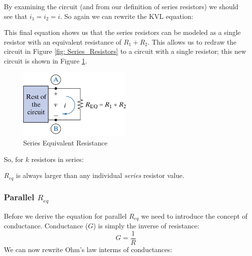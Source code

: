\documentclass{handout}
\begin{document}

By examining the circuit (and from our definition of series resistors) we should see that $i_1=i_2=i$.  So again we can rewrite the KVL equation:


This final equation shows us that the series resistors can be modeled as a single resistor with an equivalent resistance of $R_1+R_2$.  This allows us to redraw the circuit in Figure \ref{fig: Series_Resistors} to a circuit with a single resistor; this new circuit is shown in Figure \ref{fig: SeriesReq}.

\begin{figure}[h t b]
\centering
\includegraphics[width=0.5\textwidth]{SeriesReq.jpg}
\caption{Series Equivalent Resistance}
\label{fig: SeriesReq}
\end{figure}

So, for $k$ resistors in series:


$R_{eq}$ is always larger than any individual {\em series} resistor value.

\subsubsection{Parallel $R_{eq}$}
Before we derive the equation for parallel $R_{eq}$ we need to introduce the concept of conductance.  Conductance ($G$) is simply the inverse of resistance:
\begin{equation}
G=\frac{1}{R}
\end{equation}
We can now rewrite Ohm's law interms of conductances:
\end{document}
